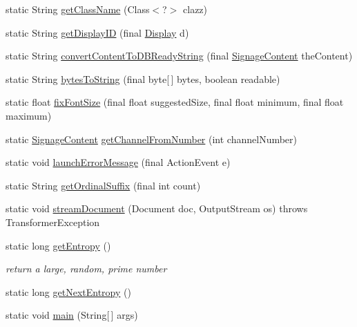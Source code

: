 \begin{DoxyCompactItemize}
\item 
static String \hyperlink{classgov_1_1fnal_1_1ppd_1_1dd_1_1util_1_1Util_aac3d060bb2e45674957e128f60d233a9}{get\-Class\-Name} (Class$<$?$>$ clazz)
\item 
static String \hyperlink{classgov_1_1fnal_1_1ppd_1_1dd_1_1util_1_1Util_ac4da7b50fd640752e2790ee3808aa151}{get\-Display\-I\-D} (final \hyperlink{interfacegov_1_1fnal_1_1ppd_1_1dd_1_1signage_1_1Display}{Display} d)
\item 
static String \hyperlink{classgov_1_1fnal_1_1ppd_1_1dd_1_1util_1_1Util_ac46597365ba0eb6bd598d00e36ad183e}{convert\-Content\-To\-D\-B\-Ready\-String} (final \hyperlink{interfacegov_1_1fnal_1_1ppd_1_1dd_1_1signage_1_1SignageContent}{Signage\-Content} the\-Content)
\item 
static String \hyperlink{classgov_1_1fnal_1_1ppd_1_1dd_1_1util_1_1Util_aadd84363c5d4610ec407b4c084350539}{bytes\-To\-String} (final byte\mbox{[}$\,$\mbox{]} bytes, boolean readable)
\item 
static float \hyperlink{classgov_1_1fnal_1_1ppd_1_1dd_1_1util_1_1Util_aba2bdd36102f83592f055146a6e83325}{fix\-Font\-Size} (final float suggested\-Size, final float minimum, final float maximum)
\item 
static \hyperlink{interfacegov_1_1fnal_1_1ppd_1_1dd_1_1signage_1_1SignageContent}{Signage\-Content} \hyperlink{classgov_1_1fnal_1_1ppd_1_1dd_1_1util_1_1Util_abe73b82f4fc3a56a1960af054402ff14}{get\-Channel\-From\-Number} (int channel\-Number)
\item 
static void \hyperlink{classgov_1_1fnal_1_1ppd_1_1dd_1_1util_1_1Util_afbfd1f27a99c8c0dc14eaf0d0c77fa4d}{launch\-Error\-Message} (final Action\-Event e)
\item 
static String \hyperlink{classgov_1_1fnal_1_1ppd_1_1dd_1_1util_1_1Util_a8a317852e12eca5eb1f1bc03752ac463}{get\-Ordinal\-Suffix} (final int count)
\item 
static void \hyperlink{classgov_1_1fnal_1_1ppd_1_1dd_1_1util_1_1Util_a1345265879de0123b77b95fe392eb2f3}{stream\-Document} (Document doc, Output\-Stream os)  throws Transformer\-Exception 
\item 
static long \hyperlink{classgov_1_1fnal_1_1ppd_1_1dd_1_1util_1_1Util_a16540497ac1870d87ff9d1957b52083b}{get\-Entropy} ()
\begin{DoxyCompactList}\small\item\em return a large, random, prime number \end{DoxyCompactList}\item 
static long \hyperlink{classgov_1_1fnal_1_1ppd_1_1dd_1_1util_1_1Util_aeb60720617f8d0573d6faf5b2621b967}{get\-Next\-Entropy} ()
\item 
static void \hyperlink{classgov_1_1fnal_1_1ppd_1_1dd_1_1util_1_1Util_a01b10d07e18fbcfddc7d8ea5bf29af30}{main} (String\mbox{[}$\,$\mbox{]} args)
\end{DoxyCompactItemize}
